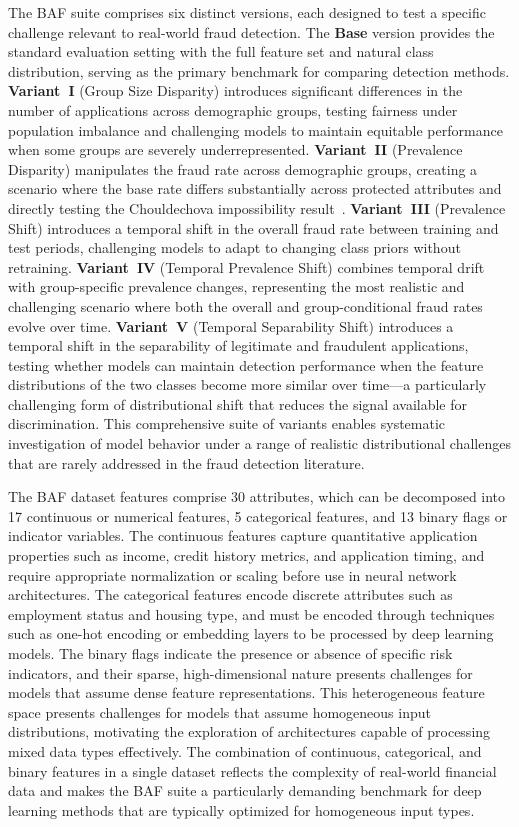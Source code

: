 The BAF suite comprises six distinct versions, each designed to test a specific
challenge relevant to real-world fraud detection. The \textbf{Base} version
provides the standard evaluation setting with the full feature set and natural
class distribution, serving as the primary benchmark for comparing detection
methods. \textbf{Variant~I} (Group Size Disparity) introduces significant
differences in the number of applications across demographic groups, testing
fairness under population imbalance and challenging models to maintain equitable
performance when some groups are severely underrepresented. \textbf{Variant~II}
(Prevalence Disparity) manipulates the fraud rate across demographic groups,
creating a scenario where the base rate differs substantially across protected
attributes and directly testing the Chouldechova impossibility
result~\cite{chouldechova2017fair}. \textbf{Variant~III} (Prevalence Shift)
introduces a temporal shift in the overall fraud rate between training and test
periods, challenging models to adapt to changing class priors without
retraining. \textbf{Variant~IV} (Temporal Prevalence Shift) combines temporal
drift with group-specific prevalence changes, representing the most realistic
and challenging scenario where both the overall and group-conditional fraud
rates evolve over time. \textbf{Variant~V} (Temporal Separability Shift)
introduces a temporal shift in the separability of legitimate and fraudulent
applications, testing whether models can maintain detection performance when the
feature distributions of the two classes become more similar over time---a
particularly challenging form of distributional shift that reduces the signal
available for discrimination. This comprehensive suite of variants enables
systematic investigation of model behavior under a range of realistic
distributional challenges that are rarely addressed in the fraud detection
literature.

The BAF dataset features comprise 30 attributes, which can be decomposed into 17
continuous or numerical features, 5 categorical features, and 13 binary flags or
indicator variables. The continuous features capture quantitative application
properties such as income, credit history metrics, and application timing, and
require appropriate normalization or scaling before use in neural network
architectures. The categorical features encode discrete attributes such as
employment status and housing type, and must be encoded through techniques such
as one-hot encoding or embedding layers to be processed by deep learning models.
The binary flags indicate the presence or absence of specific risk indicators,
and their sparse, high-dimensional nature presents challenges for models that
assume dense feature representations. This heterogeneous feature space presents
challenges for models that assume homogeneous input distributions, motivating
the exploration of architectures capable of processing mixed data types
effectively. The combination of continuous, categorical, and binary features in
a single dataset reflects the complexity of real-world financial data and makes
the BAF suite a particularly demanding benchmark for deep learning methods that
are typically optimized for homogeneous input types.

